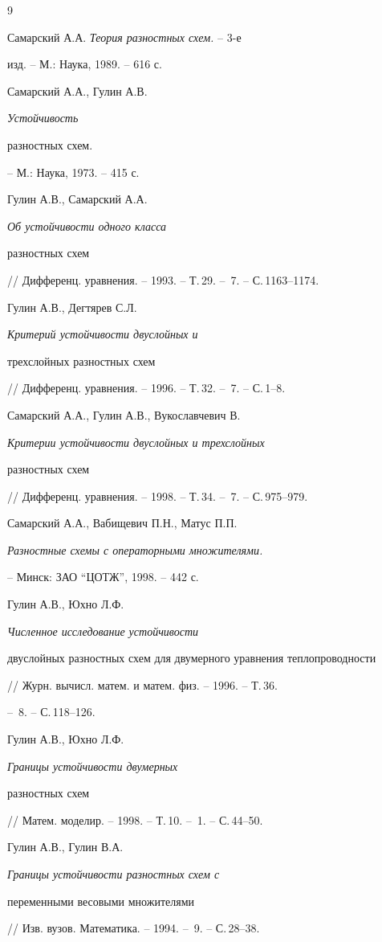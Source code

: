 \begin{thebibliography}{9}







Самарский А.А. {\it Теория разностных схем.} -- 3-е


изд. -- М.: Наука, 1989. -- 616 с.




Самарский А.А., Гулин А.В. {\it Устойчивость


разностных схем.} -- М.: Наука, 1973. -- 415 с.




Гулин А.В., Самарский А.А. {\it Об устойчивости одного класса


разностных схем}


// Дифференц. уравнения. -- 1993. -- Т.\,29. -- \No\,7. -- С.\,1163--1174.




Гулин А.В., Дегтярев С.Л. {\it Критерий устойчивости двуслойных и


трехслойных разностных схем}


// Дифференц. уравнения. -- 1996. -- Т.\,32. -- \No\,7. -- С.\,1--8.




Самарский А.А., Гулин А.В., Вукославчевич В.


{\it Критерии  устойчивости двуслойных и трехслойных


разностных схем}


// Дифференц. уравнения. -- 1998. -- Т.\,34. -- \No\,7. -- С.\,975--979.




Самарский А.А., Вабищевич П.Н., Матус П.П.


{\it Разностные схемы с операторными множителями.}


-- Минск: ЗАО ``ЦОТЖ'', 1998. -- 442 с.




Гулин А.В., Юхно Л.Ф. {\it Численное исследование устойчивости


двуслойных разностных схем для двумерного уравнения теплопроводности}


// Журн. вычисл. матем. и матем. физ. -- 1996. -- Т.\,36.


-- \No\,8. -- С.\,118--126.




Гулин А.В., Юхно Л.Ф. {\it Границы устойчивости двумерных


разностных схем}


// Матем. моделир. -- 1998. -- Т.\,10. -- \No\,1. -- С.\,44--50.




Гулин А.В., Гулин В.А. {\it Границы устойчивости разностных схем с


переменными весовыми множителями}


// Изв. вузов. Математика. -- 1994. -- \No\,9. -- С.\,28--38.





\end{thebibliography}
